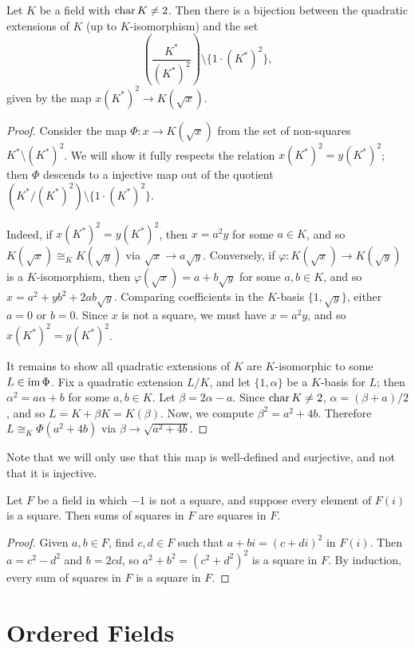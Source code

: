 \begin{lemma}
  \label{lem:deg_2_classify}
  Let $K$ be a field with $\operatorname{char} K\neq2$. Then there is a bijection between the quadratic extensions of $K$ (up to $K$-isomorphism) and the set
  \[\left(\frac{K^*}{{(K^*)^2}}\right)\setminus\{1\cdot(K^*)^2\},\]
  given by the map $x(K^*)^2\to K(\sqrt{x})$.
\end{lemma}
\begin{proof}
  Consider the map $\Phi:x\to K(\sqrt{x})$ from the set of non-squares $K^*\setminus(K^*)^2$. We will show it fully respects the relation $x(K^*)^2=y(K^*)^2$; then $\Phi$ descends to a injective map out of the quotient $(K^*/(K^*)^2)\setminus\{1\cdot(K^*)^2\}$.

  Indeed, if $x(K^*)^2=y(K^*)^2$, then $x=a^2y$ for some $a\in K$, and so $K(\sqrt{x})\cong_K K(\sqrt{y})$ via $\sqrt{x}\to a\sqrt{y}$. Conversely, if $\varphi:K(\sqrt{x})\to K(\sqrt{y})$ is a $K$-isomorphism, then $\varphi(\sqrt{x})=a+b\sqrt{y}$ for some $a,b\in K$, and so $x=a^2+yb^2+2ab\sqrt{y}$. Comparing coefficients in the $K$-basis $\{1,\sqrt{y}\}$, either $a=0$ or $b=0$. Since $x$ is not a square, we must have $x=a^2y$, and so $x(K^*)^2=y(K^*)^2$.

  It remains to show all quadratic extensions of $K$ are $K$-isomorphic to some $L\in\operatorname{im}\Phi$. Fix a quadratic extension $L/K$, and let $\{1,\alpha\}$ be a $K$-basis for $L$; then $\alpha^2=a\alpha+b$ for some $a,b\in K$. Let $\beta=2\alpha-a$. Since $\operatorname{char} K\neq 2$, $\alpha=(\beta+a)/2$, and so $L=K+\beta K=K(\beta)$. Now, we compute $\beta^2=a^2+4b$. Therefore $L\cong_K\Phi(a^2+4b)$ via $\beta\to\sqrt{a^2+4b}$.
\end{proof}

Note that we will only use that this map is well-defined and surjective, and not that it is injective.

\begin{lemma}
  \label{lem:sumsq_is_sq}
  Let $F$ be a field in which $-1$ is not a square, and suppose every element of $F(i)$ is a square. Then sums of squares in $F$ are squares in $F$.
\end{lemma}
\begin{proof}
  Given $a,b\in F$, find $c,d\in F$ such that $a+bi=(c+di)^2$ in $F(i)$. Then $a=c^2-d^2$ and $b=2cd$, so $a^2+b^2=(c^2+d^2)^2$ is a square in $F$. By induction, every sum of squares in $F$ is a square in $F$.
\end{proof}

\section{Ordered Fields}

